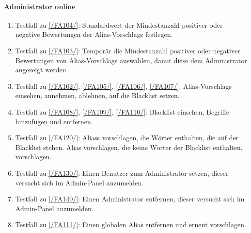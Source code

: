 \paragraph{\Gls{Administrator} online}
\begin{enumerate}[label=\textbf{/T\arabic*0/}, align=left, resume]
	\item \label{/T260/} Testfall zu \ref{/FA104/}: Standardwert der Mindestanzahl positiver oder negative Bewertungen der \Glspl{Alias-Vorschlag} festlegen.
	\item \label{/T270/} Testfall zu \ref{/FA103/}: Temporär die Mindestanzahl positiver oder negativer Bewertungen von \Glspl{Alias-Vorschlag} auswählen, damit diese dem \Gls{Administrator} angezeigt werden.
	\item \label{/T280/} Testfall zu \ref{/FA102/}, \ref{/FA105/}, \ref{/FA106/}, \ref{/FA107/}: \Glspl{Alias-Vorschlag} einsehen, annehmen, ablehnen, auf die \Gls{Blacklist} setzen.
	\item \label{/T290/} Testfall zu \ref{/FA108/}, \ref{/FA109/}, \ref{/FA110/}: \Gls{Blacklist} einsehen, Begriffe hinzufügen und entfernen.
	\item \label{/T291/} Testfall zu \ref{/FA120/}: \Glspl{Alias} vorschlagen, die Wörter enthalten, die auf der \Gls{Blacklist} stehen. \Gls{Alias} vorschlagen, die keine Wörter der \Gls{Blacklist} enthalten, vorschlagen.
	\item \label{/T292/} Testfall zu \ref{/FA130/}: Einen \Gls{Benutzer} zum \Gls{Administrator} setzen, dieser versucht sich im \Gls{Admin-Panel} anzumelden.
	\item \label{/T293/} Testfall zu \ref{/FA140/}: Einen \Gls{Administrator} entfernen, dieser versucht sich im \Gls{Admin-Panel} anzumelden.
	\item \label{/T294/} Testfall zu \ref{/FA111/}: Einen \gls{global}en \Gls{Alias} entfernen und erneut vorschlagen.
\end{enumerate}

